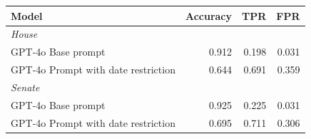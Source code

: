 
\begin{tabular}{lrrr}
\toprule
Model & Accuracy & TPR & FPR\\
\midrule
\multicolumn{4}{l}{\textit{House}}\\
\hspace{1em}GPT-4o Base prompt & 0.912 & 0.198 & 0.031\\
\hspace{1em}GPT-4o Prompt with date restriction & 0.644 & 0.691 & 0.359\\
\midrule
\multicolumn{4}{l}{\textit{Senate}}\\
\hspace{1em}GPT-4o Base prompt & 0.925 & 0.225 & 0.031\\
\hspace{1em}GPT-4o Prompt with date restriction & 0.695 & 0.711 & 0.306\\
\bottomrule
\end{tabular}
